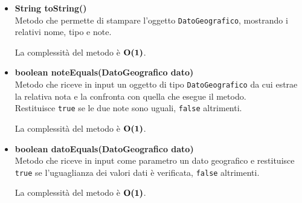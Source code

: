 \documentclass[a4paper, 12pt]{scrreprt}
\begin{document}
\begin{itemize}
				La complessit\`a del metodo \`e $\bigO\textbf{(1)}$.
				\pagebreak
				\item \textbf{String toString()}
				\\Metodo che permette di stampare l'oggetto \verb!DatoGeografico!, mostrando i relativi nome, tipo e note.

				La complessit\`a del metodo \`e $\bigO\textbf{(1)}$.

				\item \textbf{boolean noteEquals(DatoGeografico dato)}
				\\Metodo che riceve in input un oggetto di tipo \verb!DatoGeografico! da cui estrae la relativa nota e la confronta con quella che esegue il metodo.
				\\Restituisce \verb!true! se le due note sono uguali, \verb!false! altrimenti.

				La complessit\`a del metodo \`e $\bigO\textbf{(1)}$.

				\item \textbf{boolean datoEquals(DatoGeografico dato)}
				\\Metodo che riceve in input come parametro un dato geografico e restituisce \verb!true! se l'uguaglianza dei valori dati \`e verificata, \verb!false! altrimenti.

				La complessit\`a del metodo \`e $\bigO\textbf{(1)}$.

			\end{itemize}
\end{document}
